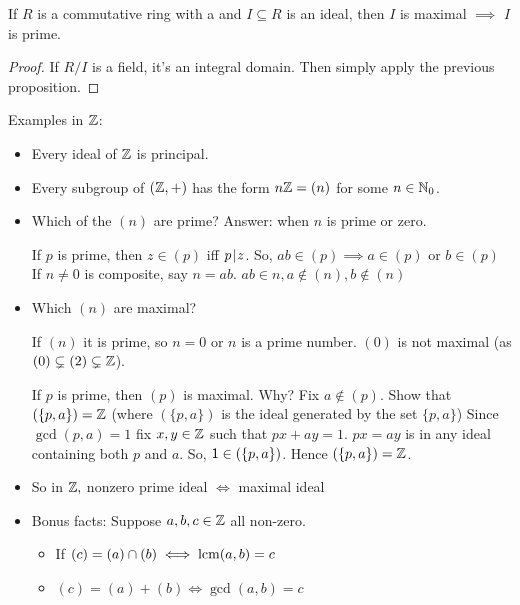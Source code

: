\documentclass[notes.tex]{subfiles}
\begin{document}
\begin{corollary}
	If $R$ is a commutative ring with a \one and $I\subseteq R$ is an ideal, then $I$ is maximal $\implies$ $I$ is prime.
\end{corollary}
\begin{proof}
	If $R/I$ is a field, it's an integral domain. Then simply apply the previous proposition.
\end{proof}

\begin{eg}
	Examples in $\mathbb{Z}$: 
	\begin{itemize}
		\item Every ideal of $\mathbb{Z}$ is principal.
		\item Every subgroup of $(\mathbb{Z}, +)$ has the form $n\mathbb{Z} = (n)$ for some $n\in \mathbb{N}_0$.
		\item Which of the $(n)$ are prime? Answer: when $n$ is prime or zero.

		If $p$ is prime, then $z\in (p)$ iff $p\mkern2mu|\mkern1mu z$.
		So, $ab\in (p)\implies a\in (p)$ or $b\in (p)$
		If $n\ne 0$ is composite, say $n=ab$. $ab\in n, a\notin(n), b\notin(n)$

		\item Which $(n)$ are maximal?

		If $(n)$ it is prime, so $n=0$ or $n$ is a prime number.
		$(0)$ is not maximal (as $(0) \subsetneq (2)\subsetneq \mathbb{Z}$).

		If $p$ is prime, then $(p)$ is maximal. Why? Fix $a\notin (p)$. Show that $(\{p, a\}) = \mathbb{Z}$ (where $(\{p, a\})$ is the ideal generated by the set $\{p, a\}$)
		Since $\gcd(p, a) =1$ fix $x, y\in \mathbb{Z}$ such that $px + ay = 1$. $px = ay$ is in any ideal containing both $p$ and $a$. So, $\mathsf{1}\in (\{p, a\})$. Hence $(\{p, a\}) = \mathbb{Z}$.

		\item So in $\mathbb{Z},$ nonzero prime ideal $\iff$ maximal ideal

		\item Bonus facts: Suppose $a, b, c\in\mathbb{Z}$ all non-zero.
		\begin{itemize}
			\item If $(c) = (a) \cap (b) \iff \operatorname{\mathrm{lcm}}(a, b) = c$
			\item $(c) = (a) + (b) \iff \gcd(a, b) = c$
		\end{itemize}
	\end{itemize}
\end{eg}
\end{document}
